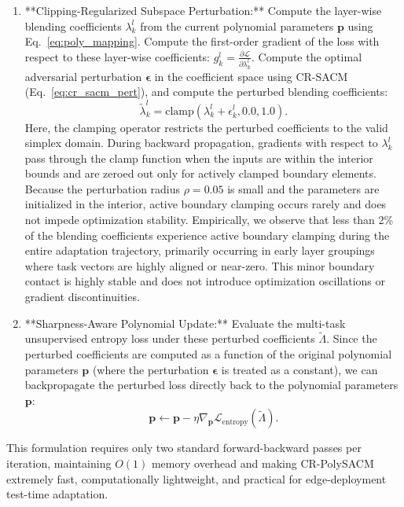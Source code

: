 \begin{enumerate}
    \item **Clipping-Regularized Subspace Perturbation:** Compute the layer-wise blending coefficients $\lambda_k^l$ from the current polynomial parameters $\mathbf{p}$ using Eq.~\ref{eq:poly_mapping}. Compute the first-order gradient of the loss with respect to these layer-wise coefficients: $g_k^l = \frac{\partial \mathcal{L}}{\partial \lambda_k^l}$. Compute the optimal adversarial perturbation $\boldsymbol{\epsilon}$ in the coefficient space using CR-SACM (Eq.~\ref{eq:cr_sacm_pert}), and compute the perturbed blending coefficients:
    \begin{equation}
        \tilde{\lambda}_k^l = \text{clamp}\left( \lambda_k^l + \epsilon_k^l, 0.0, 1.0 \right).
    \end{equation}
    Here, the clamping operator restricts the perturbed coefficients to the valid simplex domain. During backward propagation, gradients with respect to $\lambda_k^l$ pass through the clamp function when the inputs are within the interior bounds and are zeroed out only for actively clamped boundary elements. Because the perturbation radius $\rho = 0.05$ is small and the parameters are initialized in the interior, active boundary clamping occurs rarely and does not impede optimization stability. Empirically, we observe that less than 2\% of the blending coefficients experience active boundary clamping during the entire adaptation trajectory, primarily occurring in early layer groupings where task vectors are highly aligned or near-zero. This minor boundary contact is highly stable and does not introduce optimization oscillations or gradient discontinuities.
    \item **Sharpness-Aware Polynomial Update:** Evaluate the multi-task unsupervised entropy loss under these perturbed coefficients $\tilde{\Lambda}$. Since the perturbed coefficients are computed as a function of the original polynomial parameters $\mathbf{p}$ (where the perturbation $\boldsymbol{\epsilon}$ is treated as a constant), we can backpropagate the perturbed loss directly back to the polynomial parameters $\mathbf{p}$:
    \begin{equation}
        \mathbf{p} \leftarrow \mathbf{p} - \eta \nabla_{\mathbf{p}} \mathcal{L}_{\text{entropy}}(\tilde{\Lambda}).
    \end{equation}
\end{enumerate}

This formulation requires only two standard forward-backward passes per iteration, maintaining $O(1)$ memory overhead and making CR-PolySACM extremely fast, computationally lightweight, and practical for edge-deployment test-time adaptation.
